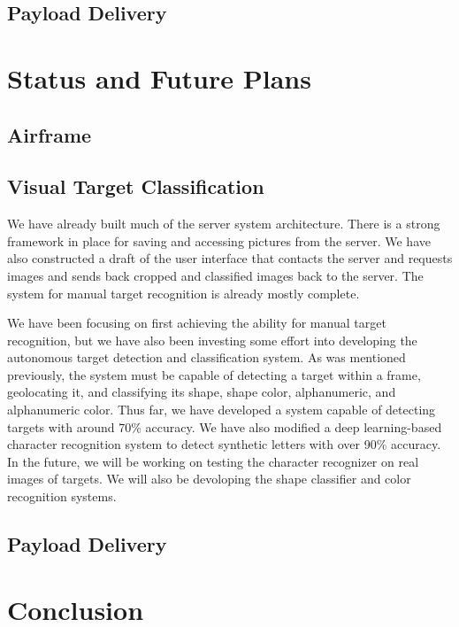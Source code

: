 \documentclass[]{auvsi_doc}
\begin{document}
\subsection{Payload Delivery}
\section{Status and Future Plans}
\subsection{Airframe}
\subsection{Visual Target Classification}
We have already built much of the server system architecture. There is a strong framework in place for saving and accessing pictures
from the server. We have also constructed a draft of the user interface that contacts the server and requests images and sends back
cropped and classified images back to the server. The system for manual target recognition is already mostly complete.

We have been focusing on first achieving the ability for manual target recognition, but we have also been investing some effort into developing
the autonomous target detection and classification system. As was mentioned previously, the system must be capable of detecting a target
within a frame, geolocating it, and classifying its shape, shape color, alphanumeric, and alphanumeric color. Thus far, we have developed a 
system capable of detecting targets with around 70\% accuracy. We have also modified a deep learning-based character recognition system
to detect synthetic letters with over 90\% accuracy. In the future, we will be working on testing the character recognizer on
real images of targets. We will also be devoloping the shape classifier and color recognition systems.
\subsection{Payload Delivery}
\section{Conclusion}

\end{document}
